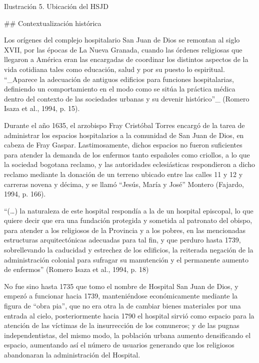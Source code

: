 Ilustración 5. Ubicación del HSJD

## Contextualización histórica

Los orígenes del complejo hospitalario San Juan de Dios se remontan al siglo XVII, por las épocas de La Nueva Granada, cuando las órdenes religiosas que llegaron a América eran las encargadas de coordinar los distintos aspectos de la vida cotidiana tales como educación, salud y por su puesto lo espiritual. “_Aparece la adecuación de antiguos edificios para funciones hospitalarias, definiendo un comportamiento en el modo como se sitúa la práctica médica dentro del contexto de las sociedades urbanas y su devenir histórico”_ (Romero Isaza et al., 1994, p. 15).

Durante el año 1635, el arzobispo Fray Cristóbal Torres encargó de la tarea de administrar los espacios hospitalarios a la comunidad de San Juan de Dios, en cabeza de Fray Gaspar. Lastimosamente, dichos espacios no fueron suficientes para atender la demanda de los enfermos tanto españoles como criollos, a lo que la sociedad bogotana reclamo, y las autoridades eclesiásticas respondieron a dicho reclamo mediante la donación de un terreno ubicado entre las calles 11 y 12 y carreras novena y décima, y se llamó “Jesús, María y José” Montero (Fajardo, 1994, p. 166).

“(…) la naturaleza de este hospital respondía a la de un hospital episcopal, lo que quiere decir que era una fundación protegida y sometida al patronato del obispo, para atender a los religiosos de la Provincia y a los pobres, en las mencionadas estructuras arquitectónicas adecuadas para tal fin, y que perduro hasta 1739, sobrellevando la caducidad y estrechez de los edificios, la reiterada negación de la administración colonial para sufragar su manutención y el permanente aumento de enfermos” (Romero Isaza et al., 1994, p. 18)

No fue sino hasta 1735 que tomo el nombre de Hospital San Juan de Dios, y empezó a funcionar hacia 1739, manteniéndose económicamente mediante la figura de “obra pia”, que no era otra la de cambiar bienes materiales por una entrada al cielo, posteriormente hacia 1790 el hospital sirvió como espacio para la atención de las víctimas de la insurrección de los comuneros; y de las pugnas independentistas, del mismo modo, la población urbana aumento densificando el espacio, aumentando así el número de usuarios generando que los religiosos abandonaran la administración del Hospital.

